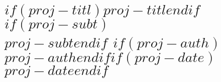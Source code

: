 \part*{$if(proj-titl)$$proj-titl$$endif$$if(proj-subt)$\\ \bigskip\bigskip\bigskip\bigskip\bigskip\normalfont\Large{$proj-subt$}$endif$ $if(proj-auth)$\\ \bigskip\bigskip\bigskip\bigskip\bigskip\normalfont\large{$proj-auth$}$endif$$if(proj-date)$\\ \bigskip\normalfont\large{$proj-date$}$endif$}
